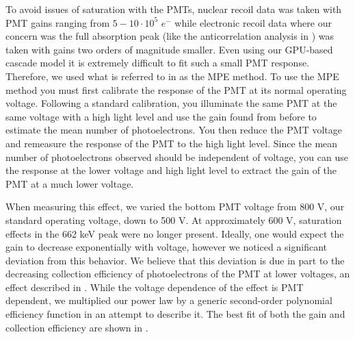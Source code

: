 To avoid issues of saturation with the PMTs, nuclear recoil data was taken with PMT gains ranging from $5-10 \cdot 10^5 \, \, e^-$ while electronic recoil data where our concern was the full absorption peak (like the anticorrelation analysis in ) was taken with gains two orders of magnitude smaller.  Even using our GPU-based cascade model it is extremely difficult to fit such a small PMT response.  Therefore, we used what is referred to in  as the MPE method.  To use the MPE method you must first calibrate the response of the PMT at its normal operating voltage.  Following a standard calibration, you illuminate the same PMT at the same voltage with a high light level and use the gain found from before to estimate the mean number of photoelectrons.  You then reduce the PMT voltage and remeasure the response of the PMT to the high light level.  Since the mean number of photoelectrons observed should be independent of voltage, you can use the response at the lower voltage and high light level to extract the gain of the PMT at a much lower voltage.

When measuring this effect, we varied the bottom PMT voltage from 800 V, our standard operating voltage, down to 500 V.  At approximately 600 V, saturation effects in the 662 keV peak were no longer present.  Ideally, one would expect the gain to decrease exponentially with voltage, however we noticed a significant deviation from this behavior.  We believe that this deviation is due in part to the decreasing collection efficiency of photoelectrons of the PMT at lower voltages, an effect described in .  While the voltage dependence of the effect is PMT dependent, we multiplied our power law by a generic second-order polynomial efficiency function in an attempt to describe it.  The best fit of both the gain and collection efficiency are shown in .

